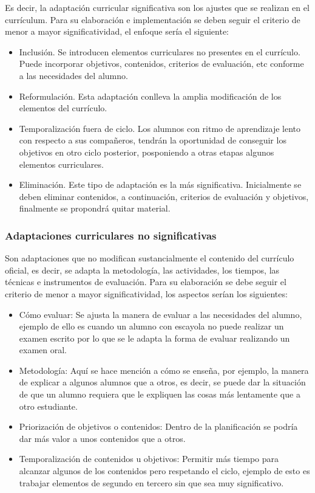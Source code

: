 Es decir, la adaptación curricular significativa son los ajustes que se realizan en el currículum. Para su elaboración e implementación se deben seguir el criterio de menor a mayor significatividad, el enfoque sería el siguiente:
\begin{itemize}
    \item Inclusión. Se introducen elementos curriculares no presentes en el currículo. Puede incorporar objetivos, contenidos, criterios de evaluación, etc conforme a las necesidades del alumno.
    \item Reformulación. Esta adaptación conlleva la amplia modificación de los elementos del currículo.
    \item Temporalización fuera de ciclo. Los alumnos con ritmo de aprendizaje lento con respecto a sus compañeros, tendrán la oportunidad de conseguir los objetivos en otro ciclo posterior, posponiendo a otras etapas algunos elementos curriculares.
    \item Eliminación. Este tipo de adaptación es la más significativa. Inicialmente se deben eliminar contenidos, a continuación, criterios de evaluación y objetivos, finalmente se propondrá quitar material.
\end{itemize}

\subsubsection{Adaptaciones curriculares no significativas}
Son adaptaciones que no modifican sustancialmente el contenido del currículo oficial, es decir, se adapta la metodología, las actividades, los tiempos, las técnicas e instrumentos de evaluación. Para su elaboración se debe  seguir el criterio de menor a mayor significatividad, los aspectos serían los siguientes:
\begin{itemize}
    \item Cómo evaluar: Se ajusta la manera de evaluar a las necesidades del alumno, ejemplo de ello es cuando un alumno con escayola no puede realizar un examen escrito por lo que se le adapta la forma de evaluar realizando un examen oral.
    \item Metodología: Aquí se hace mención a cómo se enseña, por ejemplo, la manera de explicar a algunos alumnos que a otros, es decir, se puede dar la situación de que un alumno requiera que le expliquen las cosas más lentamente que a otro estudiante.
    \item Priorización de objetivos o contenidos: Dentro de la planificación se podría dar más valor a unos contenidos que a otros.
    \item Temporalización de contenidos u objetivos: Permitir más tiempo para alcanzar algunos de los contenidos pero respetando el ciclo, ejemplo de esto es trabajar elementos de segundo en tercero sin que sea muy significativo.
\end{itemize}

